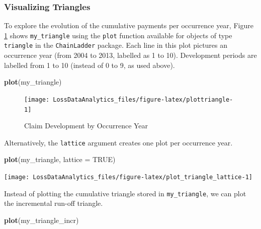 \documentclass[]{book}
\newenvironment{Shaded}{\begin{snugshade}}{\end{snugshade}}
\newcommand{\KeywordTok}[1]{\textcolor[rgb]{0.13,0.29,0.53}{\textbf{#1}}}
\newcommand{\DataTypeTok}[1]{\textcolor[rgb]{0.13,0.29,0.53}{#1}}
\newcommand{\OtherTok}[1]{\textcolor[rgb]{0.56,0.35,0.01}{#1}}
\newcommand{\NormalTok}[1]{#1}
\begin{document}
\subsubsection*{Visualizing Triangles}\label{visualizing-triangles}

To explore the evolution of the cumulative payments per occurrence year,
Figure \ref{fig:plottriangle} shows \texttt{my\_triangle} using the
\texttt{plot} function available for objects of type \texttt{triangle}
in the \texttt{ChainLadder} package. Each line in this plot pictures an
occurrence year (from 2004 to 2013, labelled as 1 to 10). Development
periods are labelled from 1 to 10 (instead of 0 to 9, as used above).

\begin{Shaded}
\begin{Highlighting}[]
\KeywordTok{plot}\NormalTok{(my_triangle)}
\end{Highlighting}
\end{Shaded}

\begin{figure}

{\centering \texttt{[image: LossDataAnalytics\_files/figure-latex/plottriangle-1]} 

}

\caption{Claim Development by Occurrence Year}\label{fig:plottriangle}
\end{figure}

Alternatively, the \texttt{lattice} argument creates one plot per
occurrence year.

\begin{Shaded}
\begin{Highlighting}[]
\KeywordTok{plot}\NormalTok{(my_triangle, }\DataTypeTok{lattice =} \OtherTok{TRUE}\NormalTok{)}
\end{Highlighting}
\end{Shaded}

\begin{center}\texttt{[image: LossDataAnalytics\_files/figure-latex/plot\_triangle\_lattice-1]} \end{center}

Instead of plotting the cumulative triangle stored in
\texttt{my\_triangle}, we can plot the incremental run-off triangle.

\begin{Shaded}
\begin{Highlighting}[]
\KeywordTok{plot}\NormalTok{(my_triangle_incr)}
\end{Highlighting}
\end{Shaded}
\end{document}
